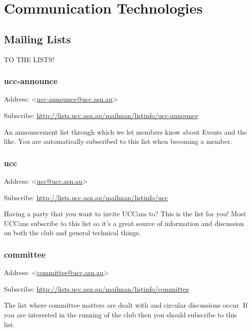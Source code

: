 \chapter{Communication Technologies}\label{Communications}


\newenvironment{ucclist}[1]
{
	\begin{mdframed}
	\subsection{#1}
	\begin{mdframed}
		Address:  <\href{mailto:#1@ucc.asn.au}{#1@ucc.asn.au}>
	\end{mdframed}
	\begin{mdframed}
		Subscribe:  \small{\url{http://lists.ucc.asn.au/mailman/listinfo/#1}}
	\end{mdframed}


	
}{\end{mdframed}}

\section{Mailing Lists}

\textsc{TO THE LISTS!}
\begin{ucclist}{ucc-announce}

An announcement list through which we let 
members know about Events and the like. You are automatically 
subscribed to this list when becoming a member. 

\end{ucclist}

\begin{ucclist}{ucc}

Having a party that you want to invite UCCans to? This is the 
list for you! Most UCCans subscribe to this list so it's a great 
source of information and discussion on both the club and general 
technical things. 

\end{ucclist}

\pagebreak

\begin{ucclist}{committee}
The list where committee matters are dealt with and circular 
discussions occur. If you are interested in the running of the club then 
you should subscribe to this list. 
\end{ucclist}

